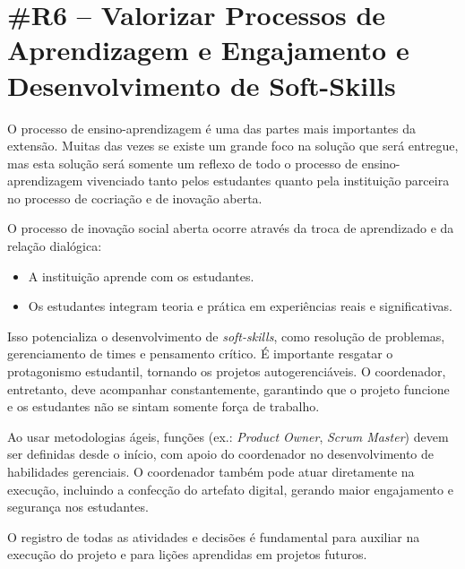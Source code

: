 \section*{\#R6 – Valorizar Processos de Aprendizagem e Engajamento e Desenvolvimento de Soft-Skills}

O processo de ensino-aprendizagem é uma das partes mais importantes da extensão. Muitas das vezes se existe um grande foco na solução que será entregue, mas esta solução será somente um reflexo de todo o processo de ensino-aprendizagem vivenciado tanto pelos estudantes quanto pela instituição parceira no processo de cocriação e de inovação aberta.

O processo de inovação social aberta ocorre através da troca de aprendizado e da relação dialógica:
\begin{itemize}
    \item A instituição aprende com os estudantes.
    \item Os estudantes integram teoria e prática em experiências reais e significativas.
\end{itemize}

Isso potencializa o desenvolvimento de \textit{soft-skills}, como resolução de problemas, gerenciamento de times e pensamento crítico. É importante resgatar o protagonismo estudantil, tornando os projetos autogerenciáveis. O coordenador, entretanto, deve acompanhar constantemente, garantindo que o projeto funcione e os estudantes não se sintam somente força de trabalho.

Ao usar metodologias ágeis, funções (ex.: \textit{Product Owner}, \textit{Scrum Master}) devem ser definidas desde o início, com apoio do coordenador no desenvolvimento de habilidades gerenciais. O coordenador também pode atuar diretamente na execução, incluindo a confecção do artefato digital, gerando maior engajamento e segurança nos estudantes.

O registro de todas as atividades e decisões é fundamental para auxiliar na execução do projeto e para lições aprendidas em projetos futuros.
